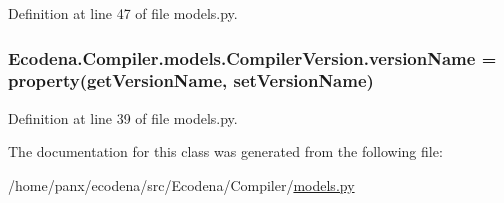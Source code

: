 Definition at line 47 of file models.py.

\hypertarget{class_ecodena_1_1_compiler_1_1models_1_1_compiler_version_ab2dc0346206f234f5731a9bd0591cee6}{
\subsubsection[{versionName}]{\setlength{\rightskip}{0pt plus 5cm}Ecodena.Compiler.models.CompilerVersion.versionName = property(getVersionName, setVersionName)}}
\label{d0/d33/class_ecodena_1_1_compiler_1_1models_1_1_compiler_version_ab2dc0346206f234f5731a9bd0591cee6}


Definition at line 39 of file models.py.



The documentation for this class was generated from the following file:\begin{DoxyCompactItemize}
\item 
/home/panx/ecodena/src/Ecodena/Compiler/\hyperlink{_compiler_2models_8py}{models.py}\end{DoxyCompactItemize}
